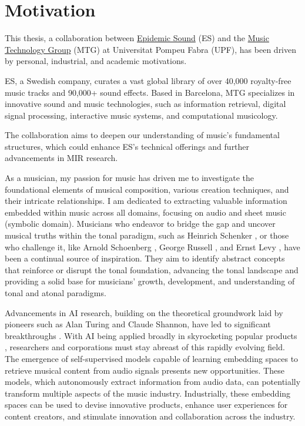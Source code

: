 \section{Motivation}

This thesis, a collaboration between \href{https://www.epidemicsound.com/}{Epidemic Sound} (ES) and the \href{https://www.upf.edu/web/mtg}{Music Technology Group} (MTG) at Universitat Pompeu Fabra (UPF), has been driven by personal, industrial, and academic motivations. 

ES, a Swedish company, curates a vast global library of over 40,000 royalty-free music tracks and 90,000+ sound effects. Based in Barcelona, MTG specializes in innovative sound and music technologies, such as information retrieval, digital signal processing, interactive music systems, and computational musicology.

The collaboration aims to deepen our understanding of music's fundamental structures, which could enhance ES's technical offerings and further advancements in MIR research.

As a musician, my passion for music has driven me to investigate the foundational elements of musical composition, various creation techniques, and their intricate relationships. I am dedicated to extracting valuable information embedded within music across all domains, focusing on audio and sheet music (symbolic domain). Musicians who endeavor to bridge the gap and uncover musical truths within the tonal paradigm, such as Heinrich Schenker \cite{Komar1959SchenkersStructure}, or those who challenge it, like Arnold Schoenberg \cite{Samson1974SchoenbergsMusic}, George Russell \cite{LydianRussell}, and Ernst Levy \cite{LevyAHarmony}, have been a continual source of inspiration. They aim to identify abstract concepts that reinforce or disrupt the tonal foundation, advancing the tonal landscape and providing a solid base for musicians' growth, development, and understanding of tonal and atonal paradigms.

Advancements in AI research, building on the theoretical groundwork laid by pioneers such as Alan Turing and Claude Shannon, have led to significant breakthroughs \cite{Vaswani2017AttentionNeed}. With AI being applied broadly in skyrocketing popular products \cite{OpenAI2023GPT-4Report}, researchers and corporations must stay abreast of this rapidly evolving field. The emergence of self-supervised models capable of learning embedding spaces to retrieve musical content from audio signals presents new opportunities. These models, which autonomously extract information from audio data, can potentially transform multiple aspects of the music industry. Industrially, these embedding spaces can be used to devise innovative products, enhance user experiences for content creators, and stimulate innovation and collaboration across the industry.

